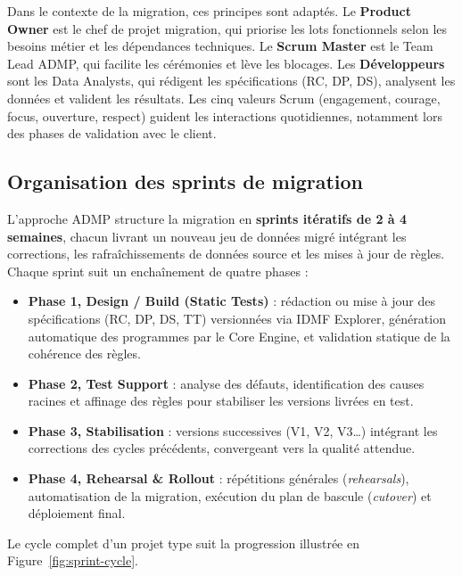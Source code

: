 Dans le contexte de la migration, ces principes sont adaptés. Le \textbf{Product Owner} est le chef de projet migration, qui priorise les lots fonctionnels selon les besoins métier et les dépendances techniques. Le \textbf{Scrum Master} est le Team Lead ADMP, qui facilite les cérémonies et lève les blocages. Les \textbf{Développeurs} sont les Data Analysts, qui rédigent les spécifications (RC, DP, DS), analysent les données et valident les résultats. Les cinq valeurs Scrum (engagement, courage, focus, ouverture, respect) guident les interactions quotidiennes, notamment lors des phases de validation avec le client.

\subsection{Organisation des sprints de migration}
\label{subsec:sprints}

L'approche ADMP structure la migration en \textbf{sprints itératifs de 2 à 4 semaines}, chacun livrant un nouveau jeu de données migré intégrant les corrections, les rafraîchissements de données source et les mises à jour de règles. Chaque sprint suit un enchaînement de quatre phases :

\begin{itemize}[leftmargin=*]
    \item \textbf{Phase 1, Design / Build (Static Tests)} : rédaction ou mise à jour des spécifications (RC, DP, DS, TT) versionnées via IDMF Explorer, génération automatique des programmes par le Core Engine, et validation statique de la cohérence des règles.
    \item \textbf{Phase 2, Test Support} : analyse des défauts, identification des causes racines et affinage des règles pour stabiliser les versions livrées en test.
    \item \textbf{Phase 3, Stabilisation} : versions successives (V1, V2, V3\ldots) intégrant les corrections des cycles précédents, convergeant vers la qualité attendue.
    \item \textbf{Phase 4, Rehearsal \& Rollout} : répétitions générales (\textit{rehearsals}), automatisation de la migration, exécution du plan de bascule (\textit{cutover}) et déploiement final.
\end{itemize}

Le cycle complet d'un projet type suit la progression illustrée en Figure~\ref{fig:sprint-cycle}.

